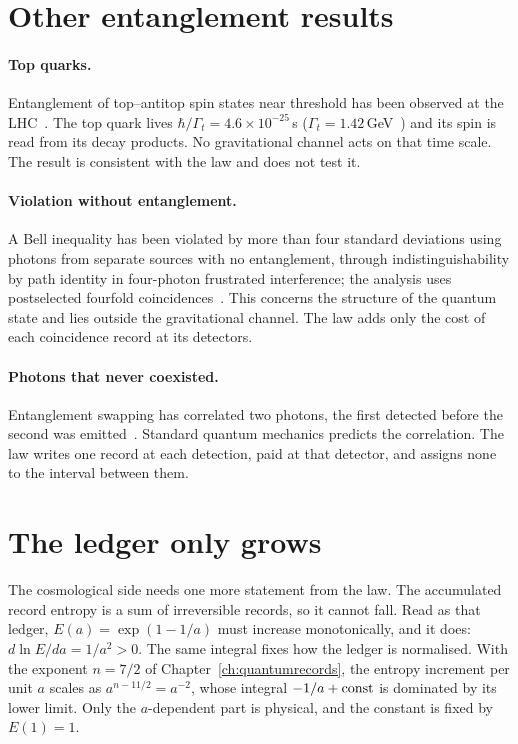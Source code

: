 \section{Other entanglement results}\label{sec:ent:other}
\paragraph{Top quarks.} Entanglement of top--antitop spin states near threshold has been observed at the LHC~\cite{ATLAS2024TopEnt,CMS2024TopEnt}.
\observed{} The top quark lives $\hbar/\Gamma_t=4.6\times10^{-25}$\,s ($\Gamma_t=1.42$\,GeV~\cite{PDG2022}) and its spin is read from its decay
products. \calc{} No gravitational channel acts on that time scale. The result is consistent with the law and does not test it.

\paragraph{Violation without entanglement.} A Bell inequality has been violated by more than four standard deviations using photons from separate
sources with no entanglement, through indistinguishability by path identity in four-photon frustrated interference; the analysis uses postselected
fourfold coincidences~\cite{Wang2025SciAdv}. \observed{} This concerns the structure of the quantum state and lies outside the gravitational channel.
The law adds only the cost of each coincidence record at its detectors.

\paragraph{Photons that never coexisted.} Entanglement swapping has correlated two photons, the first detected before the second was
emitted~\cite{Megidish2013}. \observed{} Standard quantum mechanics predicts the correlation. The law writes one record at each detection, paid at that
detector, and assigns none to the interval between them.

\section{The ledger only grows}\label{sec:ent:ledger}
The cosmological side needs one more statement from the law. The accumulated record entropy is a sum of irreversible records, so it cannot fall.
Read as that ledger, $E(a)=\exp(1-1/a)$ must increase monotonically, and it does: $d\ln E/da=1/a^2>0$. \derived{} The same integral fixes how the
ledger is normalised. With the exponent $n=7/2$ of Chapter~\ref{ch:quantumrecords}, the entropy increment per unit $a$ scales as $a^{n-11/2}=a^{-2}$,
whose integral $-1/a+{\rm const}$ is dominated by its lower limit. Only the $a$-dependent part is physical, and the constant is fixed by $E(1)=1$.
\calc

